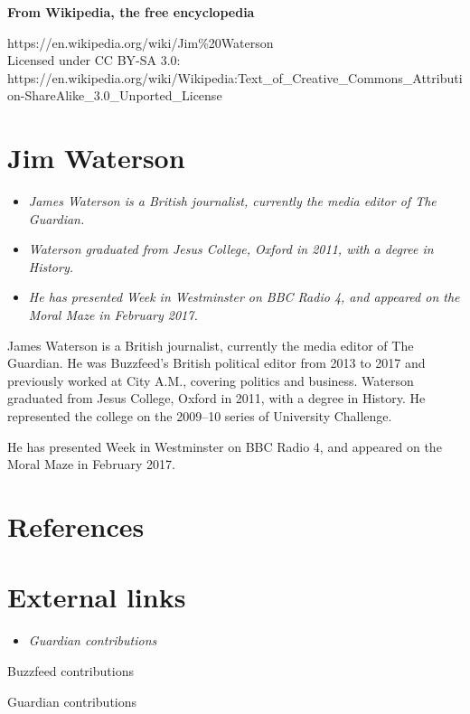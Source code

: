 \textbf{From Wikipedia, the free encyclopedia}

https://en.wikipedia.org/wiki/Jim\%20Waterson\\
Licensed under CC BY-SA 3.0:\\
https://en.wikipedia.org/wiki/Wikipedia:Text\_of\_Creative\_Commons\_Attribution-ShareAlike\_3.0\_Unported\_License

\section{Jim Waterson}\label{jim-waterson}

\begin{itemize}
\item
  \emph{James Waterson is a British journalist, currently the media
  editor of The Guardian.}
\item
  \emph{Waterson graduated from Jesus College, Oxford in 2011, with a
  degree in History.}
\item
  \emph{He has presented Week in Westminster on BBC Radio 4, and
  appeared on the Moral Maze in February 2017.}
\end{itemize}

James Waterson is a British journalist, currently the media editor of
The Guardian. He was Buzzfeed's British political editor from 2013 to
2017 and previously worked at City A.M., covering politics and business.
Waterson graduated from Jesus College, Oxford in 2011, with a degree in
History. He represented the college on the 2009--10 series of University
Challenge.

He has presented Week in Westminster on BBC Radio 4, and appeared on the
Moral Maze in February 2017.

\section{References}\label{references}

\section{External links}\label{external-links}

\begin{itemize}
\item
  \emph{Guardian contributions}
\end{itemize}

Buzzfeed contributions

Guardian contributions

